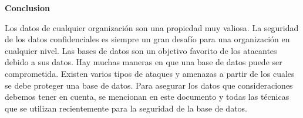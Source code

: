 \begin{large}
    \textbf{Conclusion}\\
\end{large}
Los datos de cualquier organización son una propiedad muy valiosa. La seguridad de los datos confidenciales es siempre un gran desafío para una organización en cualquier nivel. Las bases de datos son un objetivo favorito de los atacantes debido a sus datos. Hay muchas maneras en que una base de datos puede ser comprometida. Existen varios tipos de ataques y amenazas a partir de los cuales se debe proteger una base de datos. Para asegurar los datos que consideraciones debemos tener en cuenta, se mencionan en este documento y todas las técnicas que se utilizan recientemente para la seguridad de la base de datos.
